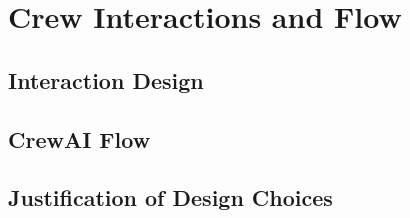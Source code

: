 \section{Crew Interactions and Flow}
\subsection{Interaction Design}
\subsection{CrewAI Flow}
\subsection{Justification of Design Choices}







